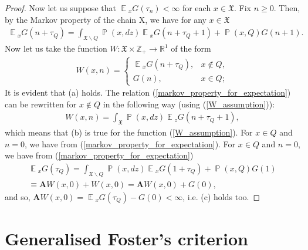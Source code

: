 \documentclass[10pt, reqno]{amsart}
\theoremstyle{definition}
\newcommand{\aasVar}{Q} %
\newcommand{\astVar}{\tau} %
\newcommand{\gtfVar}{G} %
\newcommand{\wtfVar}{W} %
\newcommand{\atoVar}{\mathbf{A}} %
\newcommand{\assVar}{\mathfrak{X}} %
\newcommand{\integers}{\mathbb{Z}} %
\newcommand{\reals}{\mathbb{R}} %
\DeclareMathOperator*{\E}{\mathbb{E}}
\DeclareMathOperator*{\Pb}{\mathbb{P}}
\begin{document}
\begin{proof}
		Now let us suppose that $\E{}_{x}\gtfVar(\astVar_{n}) < \infty$ for each $x \in \assVar$. Fix $n \geq 0$. Then, by the Markov property of the chain X, we have for any $x \in \assVar$
		\begin{gather}
		\E{}_{x}\gtfVar(n + \astVar_{\aasVar}) = \int_{\assVar\backslash\aasVar}\Pb(x, dz)\E{}_{x}\gtfVar(n + \astVar_{\aasVar} + 1) + \Pb(x, \aasVar)\gtfVar(n+1).
		\label{markov_property_for_expectation}
		\end{gather}
		Now let us take the function $\wtfVar : \assVar \times \integers_{+} \xrightarrow{} \reals^{1}$ of the form
		\begin{gather}
		\wtfVar(x, n) = \begin{cases}
		\E{}_{x}\gtfVar(n + \astVar_{\aasVar}), & x \notin Q,\\
		\gtfVar(n), & x \in \aasVar;
		\end{cases}
		\label{W_assumption}
		\end{gather}
		It is evident that (a) holds. The relation (\ref{markov_property_for_expectation}) can be rewritten for $x \notin \aasVar$ in the following way (using (\ref{W_assumption})):
		\begin{gather*}
		\wtfVar(x, n) = \int_{\assVar}\Pb(x, dz)\E{}_{z}\gtfVar(n + \astVar_{\aasVar} + 1),
		\end{gather*}
		which means that (b) is true for the function (\ref{W_assumption}). For $x \in \aasVar$ and $n = 0$, we have from (\ref{markov_property_for_expectation}). For $x \in \aasVar$ and $n = 0$, we have from (\ref{markov_property_for_expectation})
		\begin{gather*}
		\E{}_{x}\gtfVar(\astVar_{\aasVar}) = \int_{\assVar \backslash \aasVar}\Pb(x, dz)\E{}_{x}\gtfVar(1 + \astVar_{\aasVar}) + \Pb(x, \aasVar)\gtfVar(1) \\ \equiv \atoVar\wtfVar(x, 0) + \wtfVar(x, 0) = \atoVar\wtfVar(x, 0) + \gtfVar(0),
		\end{gather*}
		and so, $\atoVar\wtfVar(x, 0) = \E{}_{x}\gtfVar(\astVar_{\aasVar}) - \gtfVar(0) < \infty$, i.e. (c) holds too.
	\end{proof}
	
	\newpage
	
	\section{Generalised Foster's criterion}
	\newcommand{\hffVar}{h} %
	\newcommand{\gffVar}{g} %
	\newcommand{\cefVar}{\mathcal{E}} %
	\newcommand{\indicator}{\mathds{1}} %
	
\end{document}
